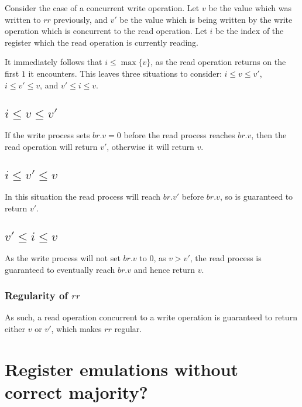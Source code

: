 \documentclass[a4paper]{scrreprt}
\begin{document}
Consider the case of a concurrent write operation. Let $v$ be the value which
was written to $rr$ previously, and $v'$ be the value which is being written by
the write operation which is concurrent to the read operation. Let $i$ be the
index of the register which the read operation is currently reading.

It immediately follows that $i \leq \max\{v\}$, as the read operation
returns on the first $1$ it encounters. This leaves three situations to
consider: $i \leq v \leq v'$, $i \leq v' \leq v$, and $v' \leq i \leq v$.

\subsection{$i \leq v \leq v'$}

If the write process sets $br.v = 0$ before the read process reaches $br.v$,
then the read operation will return $v'$, otherwise it will return $v$.

\subsection{$i \leq v' \leq v$}

In this situation the read process will reach $br.v'$ before $br.v$, so is
guaranteed to return $v'$.

\subsection{$v' \leq i \leq v$}

As the write process will not set $br.v$ to $0$, as $v > v'$, the read process
is guaranteed to eventually reach $br.v$ and hence return $v$.

\subsubsection{Regularity of $rr$}

As such, a read operation concurrent to a write operation is guaranteed to
return either $v$ or $v'$, which makes $rr$ regular.


\section{Register emulations without correct majority?}
\end{document}
